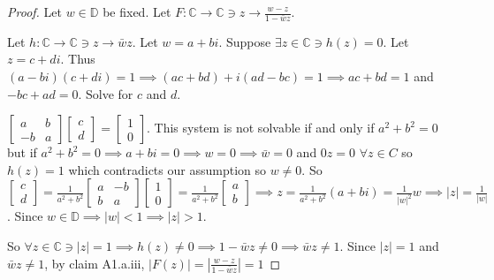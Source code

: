 \documentclass{article}
\newcommand{\C}{\mathbb{C}}
\newcommand{\abs}[1]{\left\lvert #1\right\rvert}
\begin{document}
\begin{proof}
    Let $w \in \mathbb{D}$ be fixed. Let $F: \C \to \C \ni z \to \frac{w - z}{1 - \bar{w}z}$. 

    Let $h: \C \to \C \ni z \to \bar{w}z$. Let $w = a + bi$. Suppose $\exists z \in \C \ni h(z) = 0 $. Let $z = c + di$. Thus $(a - bi)(c + di) = 1 \implies (ac + bd) + i(ad - bc) = 1 \implies ac + bd = 1$ and $-bc + ad = 0$. Solve for $c$ and $d$.
    
    $\begin{bmatrix}
        a & b \\ -b & a
    \end{bmatrix}\begin{bmatrix}
        c \\ d
    \end{bmatrix} = \begin{bmatrix}
        1 \\ 0
    \end{bmatrix}$. This system is not solvable if and only if $a^2 + b^2 = 0$ but if $a^2 + b^2 = 0 \implies a + bi = 0 \implies w = 0 \implies \bar{w} = 0$ and $0z = 0$ $\forall z \in C$ so $h(z) = 1$ which contradicts our assumption so $w \neq 0$. So $\begin{bmatrix}
        c \\ d
    \end{bmatrix} = \frac{1}{a^2 + b^2}\begin{bmatrix}
        a & -b \\ b & a
    \end{bmatrix}\begin{bmatrix}
        1 \\ 0
    \end{bmatrix} = \frac{1}{a^2 + b^2} \begin{bmatrix}
        a \\ b
    \end{bmatrix} \implies z = \frac{1}{a^2 + b^2}(a + bi) = \frac{1}{|w|^2}w \implies |z| = \frac{1}{|w|}$. Since $w \in \mathbb{D} \implies |w| < 1 \implies |z| > 1$. 
    
    So $\forall z \in \C \ni |z| = 1 \implies h(z) \neq 0 \implies 1 - \bar{w}z \neq 0 \implies \bar{w}z \neq 1$. Since $|z| = 1$ and $\bar{w}z \neq 1$, by claim A1.a.iii, $|F(z)| = \abs{\frac{w - z}{1 - \bar{w}z}} = 1$
\end{proof}
\end{document}
